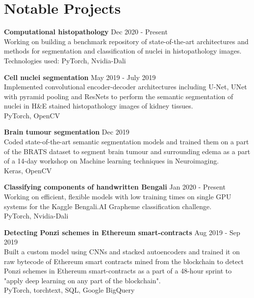 \documentclass[letterpaper]{article}
\renewenvironment{itemize}{
  \begin{list}{}{
    \setlength{\leftmargin}{1.5em}
  }
}{
  \end{list}
}
\newcommand{\smallGreyFont}[1]{\textcolor{black!80}{\small{#1}}}
\begin{document}
\section*{Notable Projects}
  \begin{itemize}
    \item
    \textbf{Computational histopathology}
    \hfill{\smallGreyFont{Dec 2020 - Present}}\\
      Working on building a benchmark repository of state-of-the-art architectures and methods for segmentation and classification of nuclei in histopathology images.\\
      \smallGreyFont{Technologies used: PyTorch, Nvidia-Dali}

    \item
    \textbf{Cell nuclei segmentation}
    \hfill{\smallGreyFont{May 2019 - July 2019}}\\
      Implemented convolutional encoder-decoder architectures including U-Net, UNet with pyramid pooling and ResNets to perform the semantic segmentation of nuclei in H\&E stained histopathology images of kidney tissues.\\
      \smallGreyFont{PyTorch, OpenCV}

    \item
    \textbf{Brain tumour segmentation}
    \hfill{\smallGreyFont{Dec 2019}}\\
       Coded state-of-the-art semantic segmentation models and trained them on a part of the BRATS dataset to segment brain tumour and surrounding edema as a part of a 14-day workshop on Machine learning techniques in Neuroimaging.\\
       \smallGreyFont{Keras, OpenCV}

    \item
    \textbf{Classifying components of handwritten Bengali}
    \hfill{\smallGreyFont{Jan 2020 - Present}}\\
      Working on efficient, flexible models with low training times on single GPU systems for the Kaggle Bengali.AI Grapheme classification challenge.\\
      \smallGreyFont{PyTorch, Nvidia-Dali}

    \item
    \textbf{Detecting Ponzi schemes in Ethereum smart-contracts}
    \hfill{\smallGreyFont{Aug 2019 - Sep 2019}}\\
      Built a custom model using CNNs and stacked autoencoders and trained it on raw bytecode of Ethereum smart contracts mined from the blockchain to detect Ponzi schemes in Ethereum smart-contracts as a part of a 48-hour sprint to "apply deep learning on any part of the blockchain".\\
      \smallGreyFont{PyTorch, torchtext, SQL, Google BigQuery}


\end{itemize}
\end{document}
